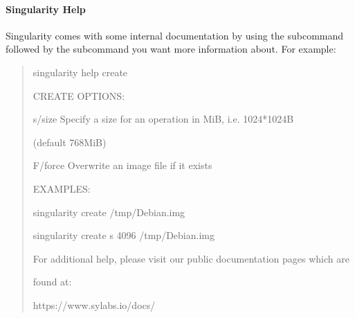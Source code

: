 \documentclass[letterpaper,10pt,english]{sphinxmanual}
\begin{document}
\paragraph{Singularity Help}
\label{\detokenize{appendix:singularity-help}}
Singularity comes with some internal documentation by using the 
subcommand followed by the subcommand you want more information about.
For example:
\begin{quote}

%
\begin{sphinxVerbatim}[commandchars=\\\{\}]
\PYGZdl{} singularity help create

CREATE OPTIONS:

    \PYGZhy{}s/\PYGZhy{}\PYGZhy{}size   Specify a size for an operation in MiB, i.e. 1024*1024B

                (default 768MiB)

    \PYGZhy{}F/\PYGZhy{}\PYGZhy{}force  Overwrite an image file if it exists


EXAMPLES:


    \PYGZdl{} singularity create /tmp/Debian.img

    \PYGZdl{} singularity create \PYGZhy{}s 4096 /tmp/Debian.img


For additional help, please visit our public documentation pages which are

found at:


    https://www.sylabs.io/docs/
\end{sphinxVerbatim}
\end{quote}
\end{document}
